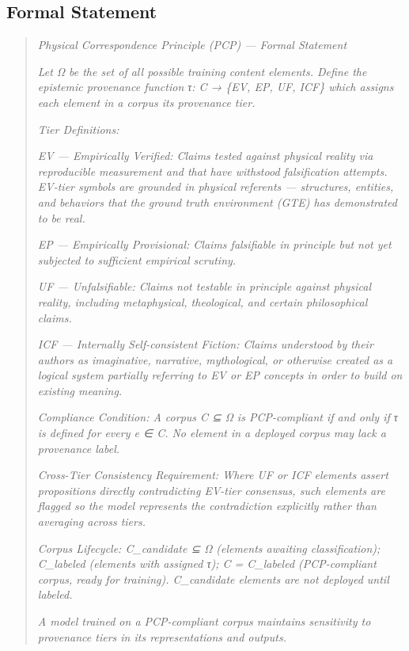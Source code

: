 \documentclass[12pt]{article}
\begin{document}
\subsection{Formal Statement}\label{formal-statement}

\begin{quote}
\emph{Physical Correspondence Principle (PCP) --- Formal Statement}

\emph{Let Ω be the set of all possible training content elements. Define
the epistemic provenance function τ: C → \{EV, EP, UF, ICF\} which
assigns each element in a corpus its provenance tier.}

\emph{Tier Definitions:}

\emph{EV --- Empirically Verified: Claims tested against physical
reality via reproducible measurement and that have withstood
falsification attempts. EV-tier symbols are grounded in physical
referents --- structures, entities, and behaviors that the ground truth
environment (GTE) has demonstrated to be real.}

\emph{EP --- Empirically Provisional: Claims falsifiable in principle
but not yet subjected to sufficient empirical scrutiny.}

\emph{UF --- Unfalsifiable: Claims not testable in principle against
physical reality, including metaphysical, theological, and certain
philosophical claims.}

\emph{ICF --- Internally Self-consistent Fiction: Claims understood by
their authors as imaginative, narrative, mythological, or otherwise
created as a logical system partially referring to EV or EP concepts in
order to build on existing meaning.}

\emph{Compliance Condition: A corpus C ⊆ Ω is PCP-compliant if and only
if τ is defined for every e ∈ C. No element in a deployed corpus may
lack a provenance label.}

\emph{Cross-Tier Consistency Requirement: Where UF or ICF elements
assert propositions directly contradicting EV-tier consensus, such
elements are flagged so the model represents the contradiction
explicitly rather than averaging across tiers.}

\emph{Corpus Lifecycle: C\_candidate ⊆ Ω (elements awaiting
classification); C\_labeled (elements with assigned τ); C = C\_labeled
(PCP-compliant corpus, ready for training). C\_candidate elements are
not deployed until labeled.}

\emph{A model trained on a PCP-compliant corpus maintains sensitivity to
provenance tiers in its representations and outputs.}
\end{quote}
\end{document}
